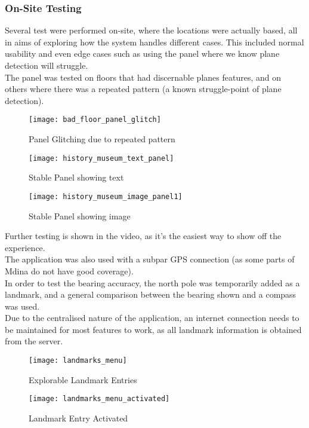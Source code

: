 \subsubsection{On-Site Testing}
Several test were performed on-site, where the locations were actually based, all in aims of exploring how the system handles different cases. 
This included normal usability and even edge cases such as using the panel where we know plane detection will struggle.
\\
The panel was tested on floors that had discernable planes features, and on others where there was a repeated pattern (a known struggle-point of plane detection).\\
\begin{figure}[!htb]
        \texttt{[image: bad\_floor\_panel\_glitch]}
            \caption{Panel Glitching due to repeated pattern}
            \label{fig:bad_panel}
    \endminipage\hfill
        \texttt{[image: history\_museum\_text\_panel]}
        \caption{Stable Panel showing text}
        \label{fig:panel_text}
    \endminipage\hfill
        \texttt{[image: history\_museum\_image\_panel1]}
        \caption{Stable Panel showing image}
        \label{fig:panel_img}
    \endminipage
    \end{figure}         
Further testing is shown in the video, as it's the easiest way to show off the experience.\\
The application was also used with a subpar GPS connection (as some parts of Mdina do not have good coverage).\\
In order to test the  bearing accuracy, the north pole was temporarily added as a landmark, and a general comparison between the bearing shown and a compass was used.\\
Due to the centralised nature of the application, an internet connection needs to be maintained for most features to work, 
as all landmark information is obtained from the server.
\begin{figure}[!htb]
        \texttt{[image: landmarks\_menu]}
            \caption{Explorable Landmark Entries}
            \label{fig:explor_lands}
    \endminipage\hfill
        \texttt{[image: landmarks\_menu\_activated]}
        \caption{Landmark Entry Activated}
        \label{fig:active_land}
    \endminipage
    \end{figure}    
